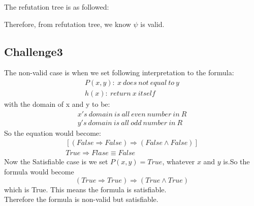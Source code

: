 \documentclass[11pt]{article}
\newcommand{\impl}{\mathbin{\Rightarrow}}
\begin{document}
\begin{enumerate}
The refutation tree is as followed:
\begin{center}
\end{center}
Therefore, from refutation tree, we know $\psi$ is valid.
\end{enumerate}

\vskip 1cm
\subsection*{Challenge3}
The non-valid case is when we set following interpretation to the formula:
\[
\begin{array}{lr}
    P(x,y):\ x\ does\ not\ equal\ to\ y
\\  h(x):\ return\ x\ itself
\end{array}
\]
with the domain of x and y to be:
\[
\begin{array}{lr}
    x's\ domain\ is\ all\ even\ number\ in\ R
\\  y's\ domain\ is\ all\ odd\ number\ in\ R
\end{array}
\]
So the equation would become:
\[
\begin{array}{lr}
    [(False \impl False) \impl (False \land False)]
\\  True \impl Flase \equiv False
\end{array}
\]
Now the Satisfiable case is we set $P(x,y) = True$, whatever $x$ and $y$ is.So the formula would become
\[(True \impl True) \impl (True \land True)\]
 which is True. This means the formula is satisfiable.\\
Therefore the formula is non-valid but satisfiable.
\newpage
\end{document}
